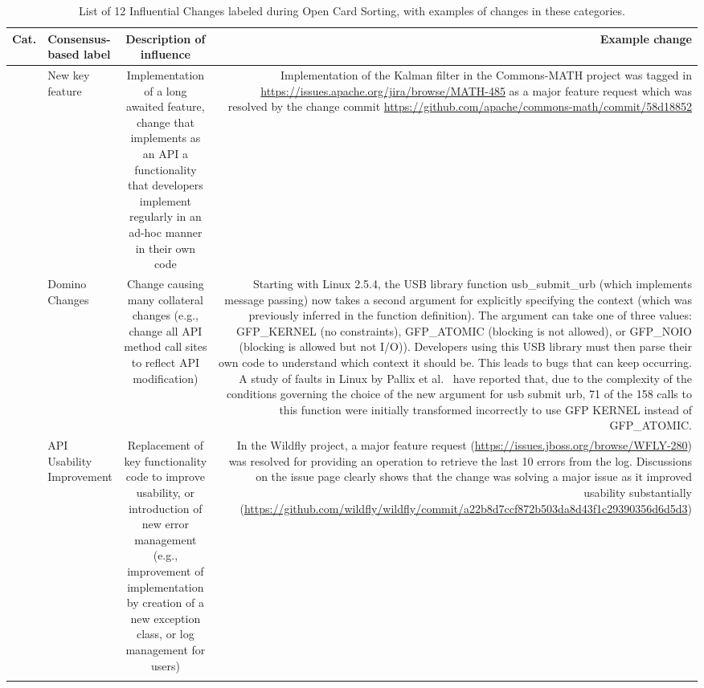  
\begin{table} [!h]
\caption{List of 12 Influential Changes labeled during Open Card Sorting, with examples of changes in these categories.}
\scriptsize
	\begin{tabular} {r | l | c | r}
	{\bf Cat.} &{\bf Consensus-based label} & {\bf Description of influence} & {\bf Example change}\\ \hline 
	\multirow{1}{*}[0cm]{\rotatebox[origin=c]{90}{Adaptive/Perfective changes}} & New key feature & \multicolumn{1}{p{4cm}|}{Implementation of a long awaited feature, change that implements as an API a functionality that developers implement regularly in an ad-hoc manner in their own code} & \multicolumn{1}{p{5.5cm}}{Implementation of the Kalman filter in the Commons-MATH project was tagged in {\tiny \url{https://issues.apache.org/jira/browse/MATH-485}} as a major feature request which was resolved by the change commit {\tiny \url{https://github.com/apache/commons-math/commit/58d18852}}\vspace{1cm} }\\ \hline \hline
	\multirow{1}{*}[-1cm]{\rotatebox[origin=c]{90}{Cross-Area changes}}&Domino Changes & \multicolumn{1}{p{4cm}|}{Change causing many collateral changes (e.g., change all API method call sites to reflect API modification)} & \multicolumn{1}{p{5.5cm}}{Starting with Linux 2.5.4, the USB library function usb\_submit\_urb (which implements message passing) now takes a second argument for explicitly specifying the context (which was previously inferred in the function definition). The argument can take one of three values: GFP\_KERNEL (no constraints), GFP\_ATOMIC (blocking is not allowed), or GFP\_NOIO (blocking is allowed but not I/O)). Developers using this USB library must then parse their own code to understand which context it should be. This leads to bugs that can keep occurring. A study of faults in Linux by Pallix et al.~\cite{Palix10Faults} have reported that, due to the complexity of the conditions governing the choice of the new argument for usb submit urb, 71 of the 158 calls to this function were initially transformed incorrectly to use GFP KERNEL instead of GFP\_ATOMIC.}\\ \hline \hline
	\multirow{4}{*}[-3cm]{\rotatebox[origin=r]{90}{Preventive changes}}&API Usability Improvement &\multicolumn{1}{p{4cm}|}{Replacement of key functionality code to improve usability, or introduction of new error management (e.g., improvement of implementation by creation of a new exception class, or log management for users)} & \multicolumn{1}{p{5.5cm}}{In the Wildfly project, a major feature request ({\tiny \url{https://issues.jboss.org/browse/WFLY-280}}) was resolved for providing an operation to retrieve the last 10 errors from the log. Discussions on the issue page clearly shows that the change was solving a major issue as it improved usability substantially ({\tiny \url{https://github.com/wildfly/wildfly/commit/a22b8d7ccf872b503da8d43f1c29390356d6d5d3}}) }\\ \cline{2-4}

\end{tabular}
\end{table}
